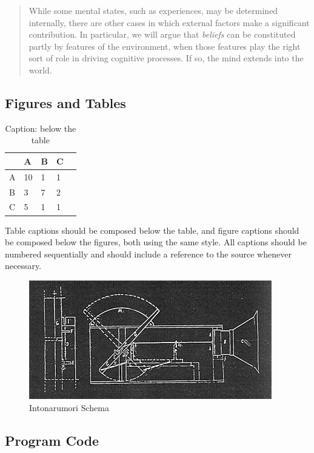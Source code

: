 \documentclass[]{article}
\begin{document}
\begin{quote}
While some mental states, such as experiences, may be determined internally, there are other cases in which external factors make a significant contribution. In particular, we will argue that \emph{beliefs} can be constituted partly by features of the environment, when those features play the right sort of role in driving cognitive processes. If so, the mind extends into the world. \cite{Clark:1998mz}
\end{quote}

\subsection{Figures and Tables}\label{figures-and-tables}

\begin{table}[h]
\centering
\label{table1}
\begin{tabular}{|l|l|l|l|l|}
\hline
  & A  & B & C  \\ \hline
A & 10 & 1 & 1  \\ \hline
B & 3  & 7 & 2  \\ \hline
C & 5  & 1 & 1  \\ \hline
\end{tabular}
\caption{Caption: below the table}
\end{table}

Table captions should be composed below the table, and figure captions should be composed below the figures, both using the same style. All captions should be numbered sequentially and should include a reference to the source whenever necessary.

\begin{figure}[h]
\begin{center}
\includegraphics{Intonarumori-schema.png}
\caption{Intonarumori Schema}
\label{fig1}
\end{center}
\end{figure}

\subsection{Program Code}\label{program-code}
\end{document}
